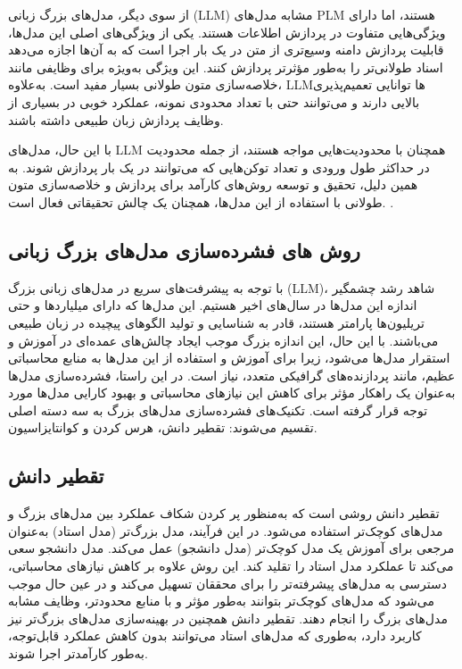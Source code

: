 از سوی دیگر، مدل‌های بزرگ زبانی (LLM) مشابه مدل‌های PLM هستند، اما دارای ویژگی‌هایی متفاوت در پردازش اطلاعات هستند. یکی از ویژگی‌های اصلی این مدل‌ها، قابلیت پردازش دامنه وسیع‌تری از متن در یک بار اجرا است که به آن‌ها اجازه می‌دهد اسناد طولانی‌تر را به‌طور مؤثرتر پردازش کنند. این ویژگی به‌ویژه برای وظایفی مانند خلاصه‌سازی متون طولانی بسیار مفید است. به‌علاوه، LLMها توانایی تعمیم‌پذیری بالایی دارند و می‌توانند حتی با تعداد محدودی نمونه، عملکرد خوبی در بسیاری از وظایف پردازش زبان طبیعی داشته باشند.

با این حال، مدل‌های LLM همچنان با محدودیت‌هایی مواجه هستند، از جمله محدودیت در حداکثر طول ورودی و تعداد توکن‌هایی که می‌توانند در یک بار پردازش شوند. به همین دلیل، تحقیق و توسعه روش‌های کارآمد برای پردازش و خلاصه‌سازی متون طولانی با استفاده از این مدل‌ها، همچنان یک چالش تحقیقاتی فعال است.
 \cite{noauthor_better_nodate}\cite{dong2023surveylongtextmodeling} \cite{Li2021PretrainedLM,}.
 \subsection{روش های فشرده‌سازی مدل‌های بزرگ زبانی}
 با توجه به پیشرفت‌های سریع در مدل‌های زبانی بزرگ (LLM)، شاهد رشد چشمگیر اندازه این مدل‌ها در سال‌های اخیر هستیم. این مدل‌ها که دارای میلیاردها و حتی تریلیون‌ها پارامتر هستند، قادر به شناسایی و تولید الگوهای پیچیده در زبان طبیعی می‌باشند. با این حال، این اندازه بزرگ موجب ایجاد چالش‌های عمده‌ای در آموزش و استقرار مدل‌ها می‌شود، زیرا برای آموزش و استفاده از این مدل‌ها به منابع محاسباتی عظیم، مانند پردازنده‌های گرافیکی متعدد، نیاز است. در این راستا، فشرده‌سازی مدل‌ها به‌عنوان یک راهکار مؤثر برای کاهش این نیازهای محاسباتی و بهبود کارایی مدل‌ها مورد توجه قرار گرفته است. تکنیک‌های فشرده‌سازی مدل‌های بزرگ به سه دسته اصلی تقسیم می‌شوند: تقطیر دانش، هرس کردن و کوانتایزاسیون.
 \subsection{تقطیر دانش}
 
 تقطیر دانش روشی است که به‌منظور پر کردن شکاف عملکرد بین مدل‌های بزرگ و مدل‌های کوچک‌تر استفاده می‌شود. در این فرآیند، مدل بزرگ‌تر (مدل استاد) به‌عنوان مرجعی برای آموزش یک مدل کوچک‌تر (مدل دانشجو) عمل می‌کند. مدل دانشجو سعی می‌کند تا عملکرد مدل استاد را تقلید کند. این روش علاوه بر کاهش نیازهای محاسباتی، دسترسی به مدل‌های پیشرفته‌تر را برای محققان تسهیل می‌کند و در عین حال موجب می‌شود که مدل‌های کوچک‌تر بتوانند به‌طور مؤثر و با منابع محدود‌تر، وظایف مشابه مدل‌های بزرگ را انجام دهند. تقطیر دانش همچنین در بهینه‌سازی مدل‌های بزرگ‌تر نیز کاربرد دارد، به‌طوری که مدل‌های استاد می‌توانند بدون کاهش عملکرد قابل‌توجه، به‌طور کارآمدتر اجرا شوند.
